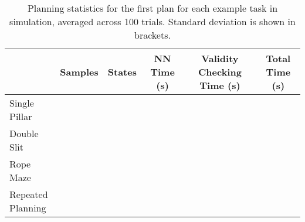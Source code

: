 \begin{table}[ht]
\centering
\caption{Planning statistics for the first plan for each example task in simulation, averaged across 100 trials. Standard deviation is shown in brackets.}
\label{tab:planning_statistics}
\begin{tabular}{lccccc}
\hline
\smallskip
                & Samples & States & \parbox{0.4in}{\smallskip \centering NN Time (s) \smallskip} & \parbox{0.7in}{\centering Validity Checking Time (s)} & \parbox{0.5in}{\centering Total Time (s)} \\
\hline
Single Pillar   & \parbox{0.37in}{} & \parbox{0.37in}{} & \parbox{0.4in}{} & \parbox{0.4in}{} & \parbox{0.3in}{} \\
Double Slit     & \parbox{0.37in}{} & \parbox{0.37in}{} & \parbox{0.4in}{} & \parbox{0.4in}{} & \parbox{0.3in}{} \\
Rope Maze       & \parbox{0.37in}{} & \parbox{0.37in}{} & \parbox{0.4in}{} & \parbox{0.4in}{} & \parbox{0.3in}{}\\
\parbox{0.7in}{Repeated\\Planning \smallskip } & \parbox{0.37in}{}  & \parbox{0.37in}{} & \parbox{0.4in}{} & \parbox{0.4in}{} & \parbox{0.3in}{}\\
\hline
\end{tabular}
\end{table}


